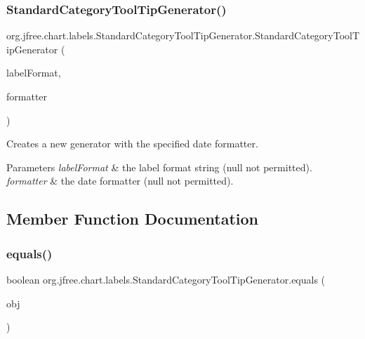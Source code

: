 \subsubsection{\texorpdfstring{Standard\+Category\+Tool\+Tip\+Generator()}{StandardCategoryToolTipGenerator()}\hspace{0.1cm}{\footnotesize\ttfamily [3/3]}}
{\footnotesize\ttfamily org.\+jfree.\+chart.\+labels.\+Standard\+Category\+Tool\+Tip\+Generator.\+Standard\+Category\+Tool\+Tip\+Generator (\begin{DoxyParamCaption}\item[{String}]{label\+Format,  }\item[{Date\+Format}]{formatter }\end{DoxyParamCaption})}

Creates a new generator with the specified date formatter.


\begin{DoxyParams}{Parameters}
{\em label\+Format} & the label format string ({\ttfamily null} not permitted). \\
\hline
{\em formatter} & the date formatter ({\ttfamily null} not permitted). \\
\hline
\end{DoxyParams}


\subsection{Member Function Documentation}
\mbox{\label{classorg_1_1jfree_1_1chart_1_1labels_1_1_standard_category_tool_tip_generator_a2158b93093c2e0c62e6e20da4abba3d7}} 
\subsubsection{\texorpdfstring{equals()}{equals()}}
{\footnotesize\ttfamily boolean org.\+jfree.\+chart.\+labels.\+Standard\+Category\+Tool\+Tip\+Generator.\+equals (\begin{DoxyParamCaption}\item[{Object}]{obj }\end{DoxyParamCaption})}

